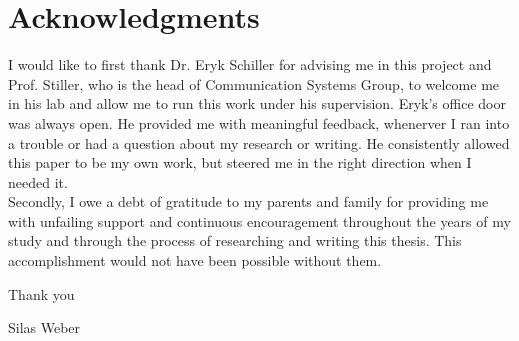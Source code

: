\chapter*{Acknowledgments}

I would like to first thank Dr. Eryk Schiller for advising me in this project and Prof. Stiller, who is the head of Communication Systems Group, to welcome me in his lab and allow me to run this work under his supervision.
Eryk's office door was always open. He provided me with meaningful feedback, whenerver I ran into a trouble or had a question about my research or writing.
He consistently allowed this paper to be my own work, but steered me in the right direction when I needed it.
\\
Secondly, I owe a debt of gratitude to my parents and family for providing me with unfailing support and continuous encouragement throughout the years of my study and through the process of researching and writing this thesis. 
This accomplishment would not have been possible without them. 

\vspace{.5cm}
Thank you

\vspace{1cm}
Silas Weber

